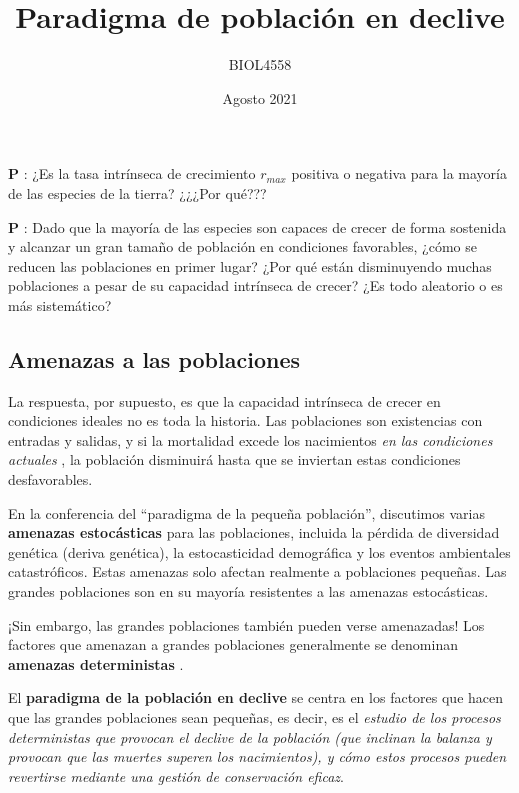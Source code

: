 \documentclass[
]{article}
\title{Paradigma de población en declive}
\author{BIOL4558}
\date{Agosto 2021}
\begin{document}
\maketitle

{
\setcounter{tocdepth}{2}
\tableofcontents
}
\textbf{P }: ¿Es la tasa intrínseca de crecimiento \(r_{max}\) positiva
o negativa para la mayoría de las especies de la tierra? ¿¿¿Por qué???

\textbf{P }: Dado que la mayoría de las especies son capaces de crecer
de forma sostenida y alcanzar un gran tamaño de población en condiciones
favorables, ¿cómo se reducen las poblaciones en primer lugar? ¿Por qué
están disminuyendo muchas poblaciones a pesar de su capacidad intrínseca
de crecer? ¿Es todo aleatorio o es más sistemático?

\hypertarget{amenazas-a-las-poblaciones}{%
\subsection{Amenazas a las
poblaciones}\label{amenazas-a-las-poblaciones}}

La respuesta, por supuesto, es que la capacidad intrínseca de crecer en
condiciones ideales no es toda la historia. Las poblaciones son
existencias con entradas y salidas, y si la mortalidad excede los
nacimientos \emph{en las condiciones actuales }, la población disminuirá
hasta que se inviertan estas condiciones desfavorables.

En la conferencia del ``paradigma de la pequeña población'', discutimos
varias \textbf{amenazas estocásticas } para las poblaciones, incluida la
pérdida de diversidad genética (deriva genética), la estocasticidad
demográfica y los eventos ambientales catastróficos. Estas amenazas solo
afectan realmente a poblaciones pequeñas. Las grandes poblaciones son en
su mayoría resistentes a las amenazas estocásticas.

¡Sin embargo, las grandes poblaciones también pueden verse amenazadas!
Los factores que amenazan a grandes poblaciones generalmente se
denominan \textbf{amenazas deterministas }.

El \textbf{paradigma de la población en declive } se centra en los
factores que hacen que las grandes poblaciones sean pequeñas, es decir,
es el \emph{estudio de los procesos deterministas que provocan el
declive de la población (que inclinan la balanza y provocan que las
muertes superen los nacimientos), y cómo estos procesos pueden
revertirse mediante una gestión de conservación eficaz}.
\end{document}
